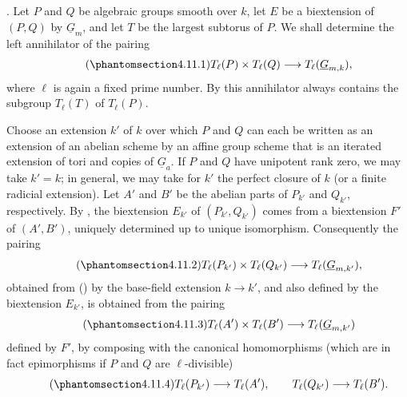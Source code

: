 
\medskip
\noindent {}.  Let $P$ and $Q$ be algebraic groups smooth over
$k$, let $E$ be a biextension of $(P,Q)$ by $\underline G_m$, and
let $T$ be the largest subtorus of $P$.  We shall determine the left
annihilator of the pairing
\begin{equation}\tag{\SGARefTarget{sga7.sga7i.eviii.n4-11-1}{4.11.1}}
 T_\ell(P)\times T_\ell(Q)
 \longrightarrow T_\ell(\underline G_{m,k}),
\end{equation}
where $\ell$ is again a fixed prime number.  By  this annihilator
always contains the subgroup $T_\ell(T)$ of $T_\ell(P)$.

Choose an extension $k'$ of $k$ over which $P$ and $Q$ can each be
written as an extension of an abelian scheme by an affine group
scheme that is an iterated extension of tori and copies of
$\underline G_a$.  If $P$ and $Q$ have unipotent rank zero, we may
take $k'=k$; in general, we may take for $k'$ the perfect closure of
$k$ (or a finite radicial extension).  Let $A'$ and $B'$ be the
abelian parts of $P_{k'}$ and $Q_{k'}$, respectively.  By , the
biextension $E_{k'}$ of $(P_{k'},Q_{k'})$ comes from a biextension
$F'$ of $(A',B')$, uniquely determined up to unique isomorphism.
Consequently the pairing
\begin{equation}\tag{\SGARefTarget{sga7.sga7i.eviii.n4-11-2}{4.11.2}}
 T_\ell(P_{k'})\times T_\ell(Q_{k'})
 \longrightarrow T_\ell(\underline G_{m,k'}),
\end{equation}
obtained from () by the base-field extension $k\to k'$, and
also defined by the biextension $E_{k'}$, is obtained from the
pairing
\begin{equation}\tag{\SGARefTarget{sga7.sga7i.eviii.n4-11-3}{4.11.3}}
 T_\ell(A')\times T_\ell(B')
 \longrightarrow T_\ell(\underline G_{m,k'})
\end{equation}
defined by $F'$, by composing with the canonical homomorphisms
(which are in fact epimorphisms if $P$ and $Q$ are
$\ell$-divisible)
\begin{equation}\tag{\SGARefTarget{sga7.sga7i.eviii.n4-11-4}{4.11.4}}
 T_\ell(P_{k'})\longrightarrow T_\ell(A'),
 \qquad
 T_\ell(Q_{k'})\longrightarrow T_\ell(B').
\end{equation}

